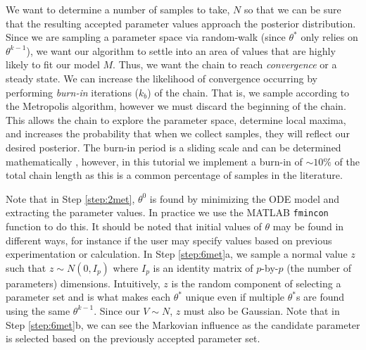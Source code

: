 \par We want to determine a number of samples to take, $N$ so that we can be sure that the resulting accepted parameter values approach the posterior distribution. Since we are sampling a parameter space via random-walk (since $\theta^*$ only relies on $\theta^{k-1}$), we want our algorithm to settle into an area of values that are highly likely to fit our model $M$. Thus, we want the chain to reach \emph{convergence} or a steady state. We can increase the likelihood of convergence occurring by performing \emph{burn-in} iterations ($k_b$) of the chain. That is, we sample according to the Metropolis algorithm, however we must discard the beginning of the chain. This allows the chain to explore the parameter space, determine local maxima, and increases the probability that when we collect samples, they will reflect our desired posterior. The burn-in period is a sliding scale and can be determined mathematically \cite{rafferty1992burnin}, however, in this tutorial we implement a burn-in of  $\sim 10\%$ of the total chain length as this is a common percentage of samples in the literature.
\par Note that in Step \ref{step:2met}, $\theta^0$ is found by minimizing the ODE model and extracting the parameter values. In practice we use the MATLAB \texttt{fmincon} function to do this. It should be noted that initial values of $\theta$ may be found in different ways, for instance if the user may specify values based on previous experimentation or calculation. In Step \ref{step:6met}a, we sample a normal value $z$ such that $z \sim N(0,I_p)$ where $I_p$ is an identity matrix of $p$-by-$p$ (the number of parameters) dimensions. Intuitively, $z$ is the random component of selecting a parameter set and is what makes each $\theta^*$ unique even if multiple $\theta^*$s are found using the same $\theta^{k-1}$. Since our $V \sim N$, $z$ must also be Gaussian. Note that in Step \ref{step:6met}b, we can see the Markovian influence as the candidate parameter is selected based on the previously accepted parameter set.

